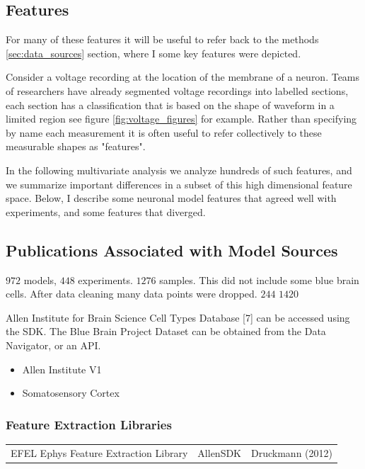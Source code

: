 \subsection{Features} 

For many of these features it will be useful to refer back to the methods \ref{sec:data_sources} section, where I some key features were depicted. 

Consider a voltage recording at the location of the membrane of a neuron. Teams of researchers have already segmented voltage recordings into labelled sections, each section has a classification that is based on the shape of waveform in a limited region see figure \ref{fig:voltage_figures} for example. Rather than specifying by name each measurement it is often useful to refer collectively to these measurable shapes as "features". 

In the following multivariate analysis we analyze hundreds of such features, and we summarize important differences in a subset of this high dimensional feature space.  Below, I describe some neuronal model features that agreed well with experiments, and some features that diverged.


\subsection{Publications Associated with Model Sources}
$972$ models, $448$ experiments.
$1276$ samples. This did not include some blue brain cells. After data cleaning many data points were dropped.  $244$
$1420$


Allen Institute for Brain Science Cell Types Database [7] can be accessed using the SDK.  The Blue Brain Project Dataset can be obtained from the Data Navigator, or an API.

\begin{itemize}
\item Allen Institute V1 \cite{gouwens2018systematic}
\item Somatosensory Cortex \cite{markram2015} 
\end{itemize}

\subsubsection{Feature Extraction Libraries}
\begin{table}
\centering
\begin{tabular}{lll}
{} EFEL Ephys Feature Extraction Library & AllenSDK & Druckmann (2012) 
\end{tabular}
\end{table}




